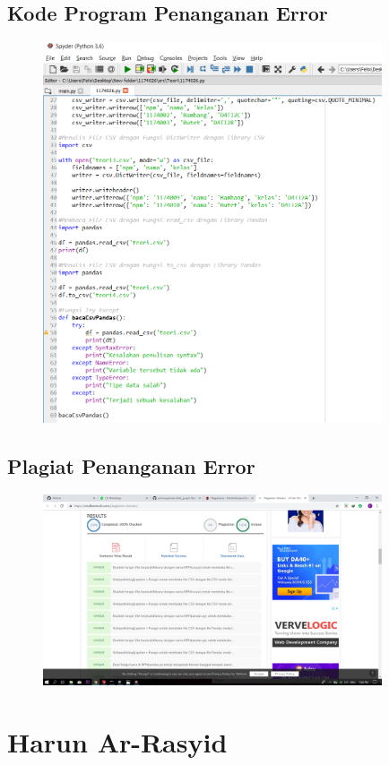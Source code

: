 \subsection{Kode Program Penanganan Error}
\begin{figure}[H]
	\includegraphics[width=10cm]{figures/4/1174026/Praktek/p1.png}
	\centering
\end{figure}

\subsection{Plagiat Penanganan Error}
\begin{figure}[H]
	\includegraphics[width=10cm]{figures/4/1174026/Praktek/plagiatpenanganan.png}
	\centering
\end{figure}


\section{Harun Ar-Rasyid}
